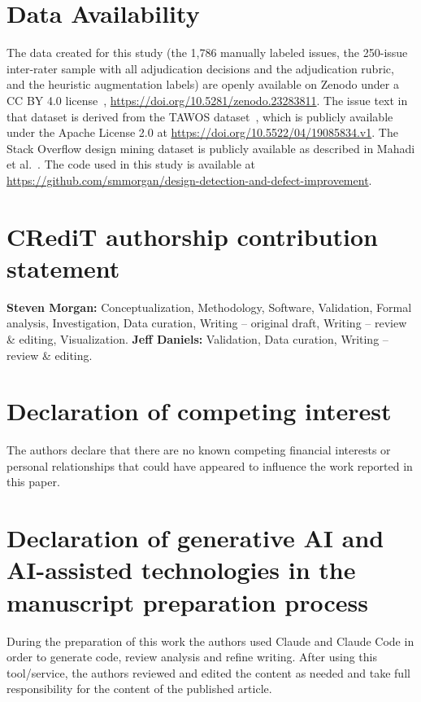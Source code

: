 \documentclass[preprint,12pt]{elsarticle}
\begin{document}
\section*{Data Availability}

The data created for this study (the 1,786 manually labeled issues, the 250-issue inter-rater sample with all adjudication decisions and the adjudication rubric, and the heuristic augmentation labels) are openly available on Zenodo under a CC BY 4.0 license~\cite{morgan2026dataset}, \url{https://doi.org/10.5281/zenodo.23283811}. The issue text in that dataset is derived from the TAWOS dataset~\cite{tawosi2022tawos}, which is publicly available under the Apache License 2.0 at \url{https://doi.org/10.5522/04/19085834.v1}. The Stack Overflow design mining dataset is publicly available as described in Mahadi et al.~\cite{mahadi2021}. The code used in this study is available at \url{https://github.com/smmorgan/design-detection-and-defect-improvement}.

\section*{CRediT authorship contribution statement}

\textbf{Steven Morgan:} Conceptualization, Methodology, Software, Validation, Formal analysis, Investigation, Data curation, Writing -- original draft, Writing -- review \& editing, Visualization. \textbf{Jeff Daniels:} Validation, Data curation, Writing -- review \& editing.

\section*{Declaration of competing interest}

The authors declare that there are no known competing financial interests or personal relationships that could have appeared to influence the work reported in this paper.

\section*{Declaration of generative AI and AI-assisted technologies in the manuscript preparation process}

During the preparation of this work the authors used Claude and Claude Code in order to generate code, review analysis and refine writing. After using this tool/service, the authors reviewed and edited the content as needed and take full responsibility for the content of the published article.
\end{document}
